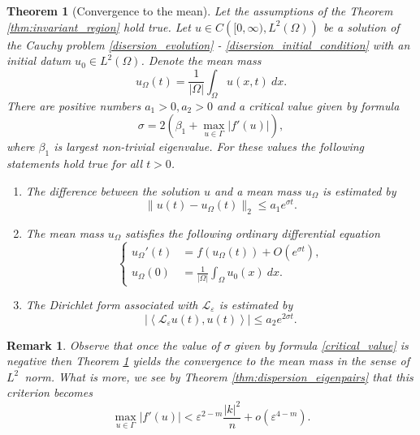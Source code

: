 \documentclass[12pt, a4paper]{article}
\makeatletter
\theoremstyle{break}
\newtheorem{thm}{Theorem}[section]
\theoremstyle{break}
\theoremstyle{break}
\newtheorem{rem}{Remark}[section]
\theoremstyle{break}
\theoremstyle{break}
\newcommand{\mylabel}[2]{#2\def\@currentlabel{#2}\label{#1}}
\newcommand{\Leo}{\mathcal{L}_{\varepsilon}}
\newcommand{\Leb}{L^2\left(\Omega\right)}
\makeatother
\begin{document}
\begin{thm}[Convergence to the mean]
    Let the assumptions of the Theorem \ref{thm:invariant_region} hold true.
    Let $u \in C\left([0, \infty), \Leb\right)$ be a solution of the Cauchy problem \eqref{disersion_evolution} - \eqref{disersion_initial_condition} with an initial datum $u_0 \in L^2\left(\Omega\right)$. Denote the mean mass
    \begin{equation*}
        u_\Omega(t) = \frac{1}{|\Omega|}\int_\Omega u(x,t)\:dx.
    \end{equation*}There are positive numbers $a_1 > 0, a_2 >0$ and a critical value given by formula
    \begin{equation}
        \sigma = 2(\beta_1 + \max_{u \in \Gamma}|f'(u)|),
        \label{critical_value}
    \end{equation}
    where $\beta_1$ is largest non-trivial eigenvalue. For these values the following statements hold true for all $t > 0$.
    \begin{enumerate}[label=\textnormal{(\arabic*)}]
        \item [\mylabel{thm:conv_i}{(i)}] The difference between the solution $u$ and a mean mass $u_\Omega$ is estimated by
        \begin{equation}
            \| u(t) - u_{\Omega}(t) \|_{2} \leq a_1 e^{\sigma t}.
        \end{equation}
        \item [\mylabel{thm:conv_ii}{(ii)}] The mean mass $u_\Omega$ satisfies the following ordinary differential equation
        \begin{equation}
            \begin{cases}
                u_\Omega'(t) &= f(u_\Omega(t)) + O(e^{\sigma t}), \\
                u_\Omega(0) &= \frac{1}{|\Omega|}\int_\Omega u_0(x)\: dx.
            \end{cases}
        \end{equation}
        \item [\mylabel{thm:conv_iii}{(iii)}] The Dirichlet form associated with $\Leo$ is estimated by
        \begin{equation}
            |\left\langle \Leo u(t), u(t) \right\rangle| \leq a_2 e^{2\sigma t}.
        \end{equation}
    \end{enumerate}
    \label{thm:convergence_to_mean_mass}
\end{thm}

\begin{rem}
    Observe that once the value of $\sigma$ given by formula \eqref{critical_value} is negative then Theorem \ref{thm:convergence_to_mean_mass} yields the convergence to the mean mass in the sense of $L^2$\ norm. What is more, we see by Theorem \ref{thm:dispersion_eigenpairs} that this criterion becomes
    \begin{equation*}
        \max_{u \in \Gamma} |f'(u)| < \varepsilon^{2-m} \frac{|k|^2}{n} + o(\varepsilon^{4-m}).
    \end{equation*}
\end{rem}
\end{document}
